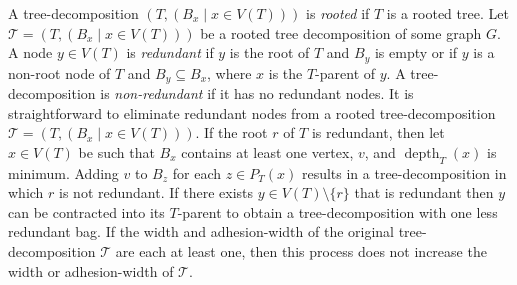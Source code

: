 \documentclass{patmorin}
\newcommand{\torso}[2]{{#1}\langle{#2}\rangle}
\DeclareMathOperator{\depth}{depth}
\newcommand{\david}[1]{{\color{orange} DW: #1}}
\newcommand{\pat}[1]{\textcolor{Blue}{PaMo: #1}}
\newcommand{\piotr}[1]{\textcolor{red}{PiMi: #1}}
\newcommand{\defin}[1]{\emph{\textcolor{brightmaroon}{#1}}}
\newcommand{\calT}{\mathcal{T}}
\newcommand{\PMtorso}{\mathrm{torso}}
\begin{document}

  A tree-decomposition $(T,(B_x \mid x\in V(T)))$ is \defin{rooted} if $T$ is a rooted tree.
  Let $\calT=(T,(B_x \mid x\in V(T)))$ be a rooted tree decomposition of some graph $G$.  A node $y\in V(T)$ is \defin{redundant} if $y$ is the root of $T$ and $B_y$ is empty or if $y$ is a non-root node of $T$ and $B_y\subseteq B_x$, where $x$ is the $T$-parent of $y$.  A tree-decomposition is \defin{non-redundant} if it has no redundant nodes.
  It is straightforward to eliminate redundant nodes from a rooted tree-decomposition $\calT=(T,(B_x \mid x\in V(T)))$.  If the root $r$ of $T$ is redundant, then let $x\in V(T)$ be such that $B_x$ contains at least one vertex, $v$, and $\depth_T(x)$ is minimum.  Adding $v$ to $B_z$ for each $z\in P_T(x)$ results in a tree-decomposition in which $r$ is not redundant.  If there exists $y\in V(T)\setminus\{r\}$ that is redundant then $y$ can be contracted into its $T$-parent to obtain a tree-decomposition with one less redundant bag.  If the width and adhesion-width of the original tree-decomposition $\mathcal{T}$ are each at least one, then this process does not increase the width or adhesion-width of $\calT$.

\end{document}
